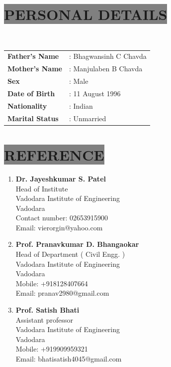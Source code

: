 \documentclass{res} %
\begin{document}
\begin{resume}
\section{
\colorbox{grey}{PERSONAL DETAILS} 
}
\ \\ [0.5ex]
\begin{tabular}{p{4cm}l}
\textbf{Father's Name} &  {:} Bhagwansinh C Chavda\\ [0.5ex]
\textbf{Mother's Name} & {:}  Manjulaben B Chavda \\ [0.5ex]
\textbf{Sex} &  {:} Male\\ [0.5ex]
\textbf{Date of Birth} & {:} 11 August 1996\\ [0.5ex]
\textbf{Nationality} &  {:} Indian\\ [0.5ex]
\textbf{Marital Status} & {:}  Unmarried\\ [0.5ex]
\end{tabular}


\section{
\colorbox{grey}{REFERENCE}
}
\begin{enumerate}

\item \textbf{Dr. Jayeshkumar S. Patel}\\ Head of Institute \\ Vadodara Institute of Engineering \\ Vadodara \\ Contact number: 02653915900 \\ Email: vierorgin@yahoo.com\\ 

\item \textbf{Prof. Pranavkumar D. Bhangaokar} \\ Head of Department ( Civil Engg. ) \\ Vadodara Institute of Engineering \\ Vadodara \\ Mobile: +918128407664 \\Email: pranav2980@gmail.com \\


\item \textbf{Prof. Satish Bhati}\\ Assistant professor \\ Vadodara Institute of Engineering \\ Vadodara \\ Mobile: +919909959321 \\ Email: bhatisatish4045@gmail.com

\end{enumerate}







\end{resume}
\end{document}
